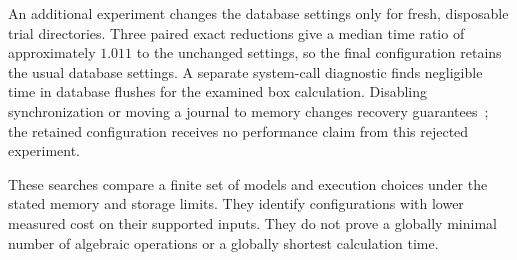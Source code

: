 An additional experiment changes the database settings only for fresh,
disposable trial directories. Three paired exact reductions give a median
time ratio of approximately $1.011$ to the unchanged settings, so the final
configuration retains the usual database settings. A separate system-call
diagnostic finds negligible time in database flushes for the examined box
calculation. Disabling synchronization or moving a journal to memory changes
recovery guarantees~\cite{SQLitePragmas}; the retained configuration receives
no performance claim from this rejected experiment.

These searches compare a finite set of models and execution choices under
the stated memory and storage limits. They identify configurations with lower
measured cost on their supported inputs. They do not prove a globally minimal
number of algebraic operations or a globally shortest calculation time.

